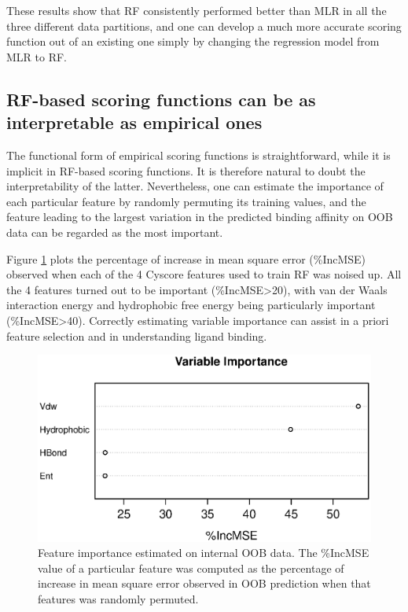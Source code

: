 \documentclass[journal=jacsat,manuscript=article]{achemso}
\begin{document}
These results show that RF consistently performed better than MLR in all the three different data partitions, and one can develop a much more accurate scoring function out of an existing one simply by changing the regression model from MLR to RF.

\subsection{RF-based scoring functions can be as interpretable as empirical ones} %

The functional form of empirical scoring functions is straightforward, while it is implicit in RF-based scoring functions. It is therefore natural to doubt the interpretability of the latter. Nevertheless, one can estimate the importance of each particular feature by randomly permuting its training values, and the feature leading to the largest variation in the predicted binding affinity on OOB data can be regarded as the most important.

Figure \ref{fig:varimp} plots the percentage of increase in mean square error (\%IncMSE) observed when each of the 4 Cyscore features used to train RF was noised up. All the 4 features turned out to be important (\%IncMSE\textgreater 20), with van der Waals interaction energy and hydrophobic free energy being particularly important (\%IncMSE\textgreater 40). Correctly estimating variable importance can assist in a priori feature selection and in understanding ligand binding.

\begin{figure}
\includegraphics[width=\linewidth]{../rfcyscore/x4/rf/trn-1105.eps}
\caption{Feature importance estimated on internal OOB data. The \%IncMSE value of a particular feature was computed as the percentage of increase in mean square error observed in OOB prediction when that features was randomly permuted.}
\label{fig:varimp}
\end{figure}
\end{document}
